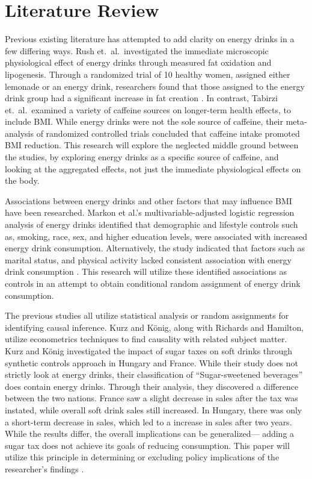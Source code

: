 \documentclass[12pt]{article}
\begin{document}
\section{Literature Review}

Previous existing literature has attempted to add clarity on energy drinks in a few differing ways. Rush et.\ al.\ investigated the immediate microscopic physiological effect of energy drinks through measured fat oxidation and lipogenesis. Through a randomized trial of 10 healthy women, assigned either lemonade or an energy drink, researchers found that those assigned to the energy drink group had a significant increase in fat creation \citep{rush2006}. In contrast, Tabirzi et.\ al.\ examined a variety of caffeine sources on longer-term health effects, to include BMI. While energy drinks were not the sole source of caffeine, their meta-analysis of randomized controlled trials concluded that caffeine intake promoted BMI reduction. This research will explore the neglected middle ground between the studies, by exploring energy drinks as a specific source of caffeine, and looking at the aggregated effects, not just the immediate physiological effects on the body.

Associations between energy drinks and other factors that may influence BMI have been researched. Markon et al.'s multivariable-adjusted logistic regression analysis of energy drinks identified that demographic and lifestyle controls such as, smoking, race, sex, and higher education levels, were associated with increased energy drink consumption. Alternatively, the study indicated that factors such as marital status, and physical activity lacked consistent association with energy drink consumption \citep{markon2023}. This research will utilize these identified associations as controls in an attempt to obtain conditional random assignment of energy drink consumption.

The previous studies all utilize statistical analysis or random assignments for identifying causal inference. Kurz and K\"{o}nig, along with Richards and Hamilton, utilize econometrics techniques to find causality with related subject matter. Kurz and K\"{o}nig investigated the impact of sugar taxes on soft drinks through synthetic controls approach in Hungary and France. While their study does not strictly look at energy drinks, their classification of ``Sugar-sweetened beverages'' does contain energy drinks. Through their analysis, they discovered a difference between the two nations. France saw a slight decrease in sales after the tax was instated, while overall soft drink sales still increased. In Hungary, there was only a short-term decrease in sales, which led to a increase in sales after two years. While the results differ, the overall implications can be generalized--- adding a sugar tax does not achieve its goals of reducing consumption. This paper will utilize this principle in determining or excluding policy implications of the researcher's findings \citep{kurz2021}.
\end{document}
